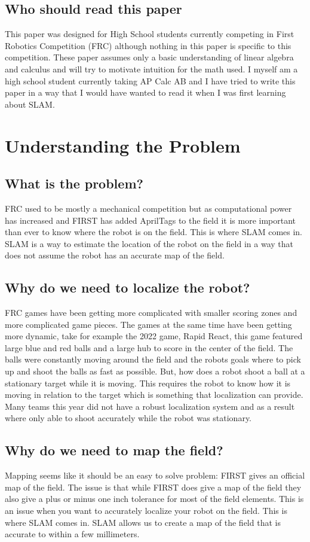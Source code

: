 \documentclass{scrartcl}
\begin{document}
\subsection{Who should read this paper}
This paper was designed for High School students currently competing in First Robotics Competition (FRC) although nothing in this paper is specific to this competition. These paper assumes only a basic understanding of linear algebra and calculus and will try to motivate intuition for the math used. I myself am a high school student currently taking AP Calc AB and I have tried to write this paper in a way that I would have wanted to read it when I was first learning about SLAM.

\newpage
\section{Understanding the Problem}
\subsection{What is the problem?}
FRC used to be mostly a mechanical competition but as computational power has increased and FIRST has added AprilTags to the field it is more important than ever to know where the robot is on the field. This is where SLAM comes in. SLAM is a way to estimate the location of the robot on the field in a way that does not assume the robot has an accurate map of the field.

\subsection{Why do we need to localize the robot?}
FRC games have been getting more complicated with smaller scoring zones and more complicated game pieces. The games at the same time have been getting more dynamic, take for example the 2022 game, Rapid React, this game featured large blue and red balls and a large hub to score in the center of the field. The balls were constantly moving around the field and the robots goals where to pick up and shoot the balls as fast as possible. But, how does a robot shoot a ball at a stationary target while it is moving. This requires the robot to know how it is moving in relation to the target which is something that localization can provide. Many teams this year did not have a robust localization system and as a result where only able to shoot accurately while the robot was stationary.

\subsection{Why do we need to map the field?}
Mapping seems like it should be an easy to solve problem: FIRST gives an official map of the field. The issue is that while FIRST does give a map of the field they also give a plus or minus one inch tolerance for most of the field elements. This is an issue when you want to accurately localize your robot on the field. This is where SLAM comes in. SLAM allows us to create a map of the field that is accurate to within a few millimeters.
\end{document}
